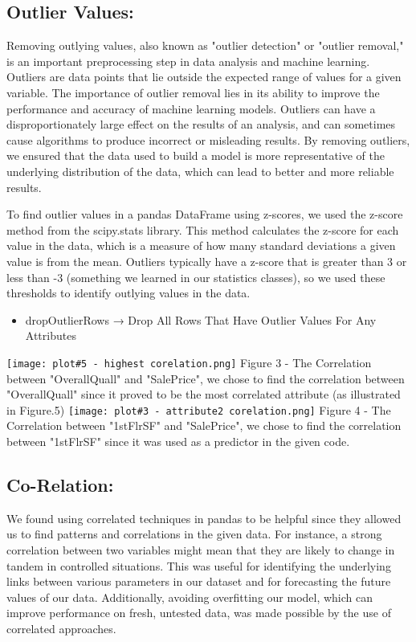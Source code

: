 \documentclass[10pt,twocolumn,letterpaper]{article}
\begin{document}
\subsection{Outlier Values:}
Removing outlying values, also known as "outlier detection" or "outlier removal," is an important preprocessing step in data analysis and machine learning. Outliers are data points that lie outside the expected range of values for a given variable. The importance of outlier removal lies in its ability to improve the performance and accuracy of machine learning models. Outliers can have a disproportionately large effect on the results of an analysis, and can sometimes cause algorithms to produce incorrect or misleading results. By removing outliers, we ensured that the data used to build a model is more representative of the underlying distribution of the data, which can lead to better and more reliable results.

To find outlier values in a pandas DataFrame using z-scores, we used the z-score method from the scipy.stats library. This method calculates the z-score for each value in the data, which is a measure of how many standard deviations a given value is from the mean. Outliers typically have a z-score that is greater than 3 or less than -3 (something we learned in our statistics classes), so we used these thresholds to identify outlying values in the data.
\begin{itemize}
    \item dropOutlierRows → Drop All Rows That Have Outlier Values For Any Attributes
\end{itemize}


\texttt{[image: plot\#5 - highest corelation.png]}
Figure 3 - The Correlation between "OverallQuall" and "SalePrice", we chose to find the correlation between "OverallQuall" since it proved to be the most correlated attribute (as illustrated in Figure.5)
\texttt{[image: plot\#3 - attribute2 corelation.png]}
Figure 4 - The Correlation between "1stFlrSF" and "SalePrice", we chose to find the correlation between "1stFlrSF" since it was used as a predictor in the given code.
\subsection{Co-Relation:}
We found using correlated techniques in pandas to be helpful since they allowed us to find patterns and correlations in the given data. For instance, a strong correlation between two variables might mean that they are likely to change in tandem in controlled situations. This was useful for identifying the underlying links between various parameters in our dataset and for forecasting the future values of our data. Additionally, avoiding overfitting our model, which can improve performance on fresh, untested data, was made possible by the use of correlated approaches.
\end{document}
